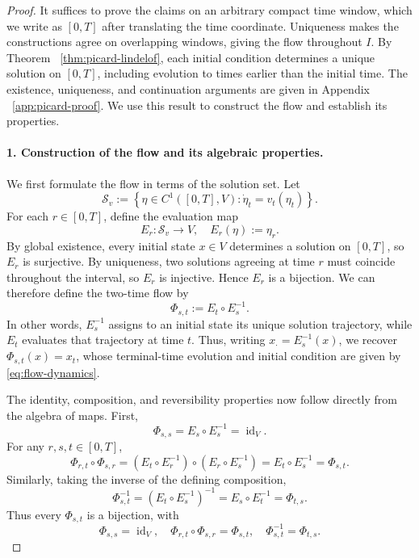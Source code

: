 \documentclass[12pt,a4paper,oneside]{book}
\begin{document}
\begin{proof}
It suffices to prove the claims on an arbitrary compact time window, which we write as $[0,T]$ after translating the time
coordinate. Uniqueness makes the constructions agree on overlapping windows, giving the flow throughout $I$. By Theorem
~\ref{thm:picard-lindelof}, each initial condition determines a unique solution on $[0,T]$, including evolution to times
earlier than the initial time. The existence, uniqueness, and continuation arguments are given in Appendix ~\ref{app:picard-proof}.
We use this result to construct the flow and establish its properties.

\paragraph{1. Construction of the flow and its algebraic properties.}

We first formulate the flow in terms of the solution set. Let
\begin{equation*}
    \mathcal S_v :=
        \left\{
            \eta\in C^1([0,T],V): \dot\eta_t=v_t(\eta_t)
        \right\}.
\end{equation*}
For each $r\in[0,T]$, define the evaluation map
\begin{equation*}
    E_r:\mathcal S_v\to V, \quad E_r(\eta):=\eta_r.
\end{equation*}
By global existence, every initial state $x\in V$ determines a solution on $[0,T]$, so $E_r$ is surjective. By uniqueness,
two solutions agreeing at time $r$ must coincide throughout the interval, so $E_r$ is injective. Hence $E_r$ is a bijection.
We can therefore define the two-time flow by
\begin{equation*}
    \Phi_{s,t}:=E_t\circ E_s^{-1}.
\end{equation*}
In other words, $E_s^{-1}$ assigns to an initial state its unique solution trajectory, while $E_t$ evaluates that trajectory
at time $t$. Thus, writing $x_\cdot=E_s^{-1}(x)$, we recover $\Phi_{s,t}(x)=x_t$, whose terminal-time evolution and initial condition
are given by \eqref{eq:flow-dynamics}.

The identity, composition, and reversibility properties now follow directly from the algebra of maps. First,
\begin{equation*}
    \Phi_{s,s} = E_s\circ E_s^{-1} = \operatorname{id}_V.
\end{equation*}
For any $r,s,t\in[0,T]$,
\begin{equation*}
    \Phi_{r,t}\circ\Phi_{s,r}
    =(E_t\circ E_r^{-1})\circ(E_r\circ E_s^{-1})
    =E_t\circ E_s^{-1}
    =\Phi_{s,t}.
\end{equation*}
Similarly, taking the inverse of the defining composition,
\begin{equation*}
    \Phi_{s,t}^{-1}=(E_t\circ E_s^{-1})^{-1}=E_s\circ E_t^{-1}=\Phi_{t,s}.
\end{equation*}
Thus every $\Phi_{s,t}$ is a bijection, with
\begin{equation*}
    \Phi_{s,s}=\operatorname{id}_V,\quad
    \Phi_{r,t}\circ\Phi_{s,r}=\Phi_{s,t},\quad
    \Phi_{s,t}^{-1}=\Phi_{t,s}.
\end{equation*}


\end{proof}
\end{document}

